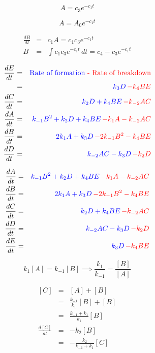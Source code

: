 \documentclass{article}
\begin{document}
\[ A = c_3 e^{-c_1 t} \]

\[ A = A_0 e^{-c_1 t} \]

\begin{eqnarray*}
\frac{dB}{dt} & = & c_1 A = c_1c_3 e^{-c_1 t}\\
B & = & \int c_1c_3 e^{-c_1t} \, dt = c_4 -c_3 e^{-c_1 t}
\end{eqnarray*}

\begin{eqnarray*}
\frac{dE}{dt} & = & \textrm{\color{blue} Rate of formation }  \textrm{\color{red} - Rate of breakdown}\\
& = & {\color{blue} k_3 D} {\color{red} \, - k_4 B E}\\
\frac{dC}{dt} & = & {\color{blue} k_2 D + k_4 B E} {\color{red} \, - k_{-2} A C}\\
\frac{dA}{dt} & = & {\color{blue} k_{-1} B^2 + k_2 D + k_4 B E} {\color{red} \, - k_1 A - k_{-2} A C}\\
\frac{dB}{dt} & = & {\color{blue} 2k_1 A + k_3 D} { \color{red}\,  - 2k_{-1} B^2 - k_4 B E}\\
\frac{dD}{dt} & = & {\color{blue} k_{-2} A C - k_3 D} {\color{red}\,  - k_2 D}
\end{eqnarray*}

\begin{eqnarray*}
\frac{dA}{dt} & = & {\color{blue} k_{-1} B^2 + k_2 D + k_4 B E} {\color{red} \, - k_1 A - k_{-2} A C}\\
\frac{dB}{dt} & = & {\color{blue} 2 k_1 A + k_3 D} { \color{red}\,  - 2k_{-1} B^2 - k_4 B E}\\
\frac{dC}{dt} & = & {\color{blue} k_2 D + k_4 B E} {\color{red} \, - k_{-2} A C}\\
\frac{dD}{dt} & = & {\color{blue} k_{-2} A C - k_3 D} {\color{red}\,  - k_2 D}\\
\frac{dE}{dt} & = & {\color{blue} k_3 D} {\color{red} \, - k_4 B E}
\end{eqnarray*}

\[ k_1 \left[ A \right] = k_{-1} \left[ B \right]  \implies  \frac{k_1}{k_{-1}} = \frac{\left[B \right]}{\left[ A \right]} \]

\begin{eqnarray*}
\left[ C \right] & = & \left[ A \right] + \left[ B \right]\\
& = & \frac{k_{-1}}{k_1}  \left[ B \right] +  \left[ B \right]\\
& = & \frac{k_{-1} + k_1}{ k_1} \left[ B \right]\\
\frac{d\left[ C \right]}{dt} & = & - k_2 \left[ B \right]\\
& = & - \frac{ k_2}{k_{-1} + k_1} \left[ C \right]
\end{eqnarray*}
\end{document}
